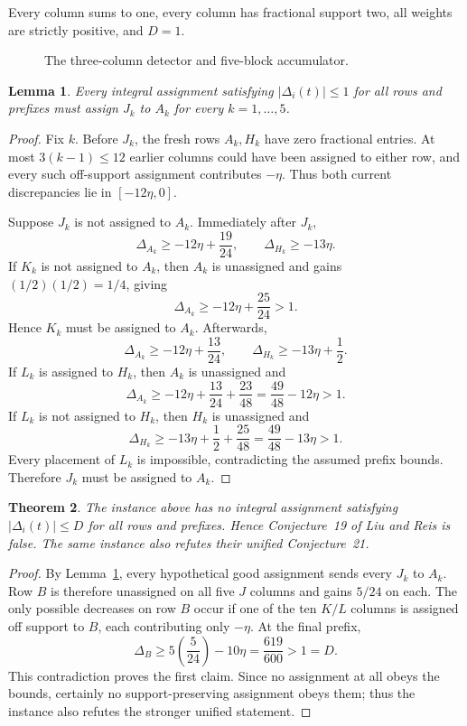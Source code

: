\documentclass[11pt]{article}
\newtheorem{theorem}{Theorem}[section]
\newtheorem{lemma}[theorem]{Lemma}
\theoremstyle{definition}
\begin{document}
Every column sums to one, every column has fractional support two, all weights
are strictly positive, and $D=1$.

\begin{figure}[ht]
\centering

\caption{The three-column detector and five-block accumulator.}
\label{fig:chairman}
\end{figure}

\begin{lemma}\label{lem:forcing}
Every integral assignment satisfying $|\Delta_i(t)|\le1$ for all rows and
prefixes must assign $J_k$ to $A_k$ for every $k=1,\dots,5$.
\end{lemma}
\begin{proof}
Fix $k$.  Before $J_k$, the fresh rows $A_k,H_k$ have zero fractional entries.
At most $3(k-1)\le12$ earlier columns could have been assigned to either row,
and every such off-support assignment contributes $-\eta$.  Thus both current
discrepancies lie in $[-12\eta,0]$.

Suppose $J_k$ is not assigned to $A_k$.  Immediately after $J_k$,
\[
 \Delta_{A_k}\ge-12\eta+\frac{19}{24},
 \qquad
 \Delta_{H_k}\ge-13\eta.
\]
If $K_k$ is not assigned to $A_k$, then $A_k$ is unassigned and gains
$(1/2)(1/2)=1/4$, giving
\[
 \Delta_{A_k}\ge-12\eta+\frac{25}{24}>1.
\]
Hence $K_k$ must be assigned to $A_k$.  Afterwards,
\[
 \Delta_{A_k}\ge-12\eta+\frac{13}{24},
 \qquad
 \Delta_{H_k}\ge-13\eta+\frac12.
\]
If $L_k$ is assigned to $H_k$, then $A_k$ is unassigned and
\[
 \Delta_{A_k}\ge-12\eta+\frac{13}{24}+\frac{23}{48}
 =\frac{49}{48}-12\eta>1.
\]
If $L_k$ is not assigned to $H_k$, then $H_k$ is unassigned and
\[
 \Delta_{H_k}\ge-13\eta+\frac12+\frac{25}{48}
 =\frac{49}{48}-13\eta>1.
\]
Every placement of $L_k$ is impossible, contradicting the assumed prefix
bounds.  Therefore $J_k$ must be assigned to $A_k$.
\end{proof}

\begin{theorem}\label{thm:chairman}
The instance above has no integral assignment satisfying
$|\Delta_i(t)|\le D$ for all rows and prefixes.  Hence Conjecture~19 of Liu
and Reis is false.  The same instance also refutes their unified
Conjecture~21.
\end{theorem}
\begin{proof}
By Lemma~\ref{lem:forcing}, every hypothetical good assignment sends every
$J_k$ to $A_k$.  Row $B$ is therefore unassigned on all five $J$ columns and
gains $5/24$ on each.  The only possible decreases on row $B$ occur if one of
the ten $K/L$ columns is assigned off support to $B$, each contributing only
$-\eta$.  At the final prefix,
\[
 \Delta_B\ge5\left(\frac5{24}\right)-10\eta
 =\frac{619}{600}>1=D.
\]
This contradiction proves the first claim.  Since no assignment at all obeys
the bounds, certainly no support-preserving assignment obeys them; thus the
instance also refutes the stronger unified statement.
\end{proof}
\end{document}
